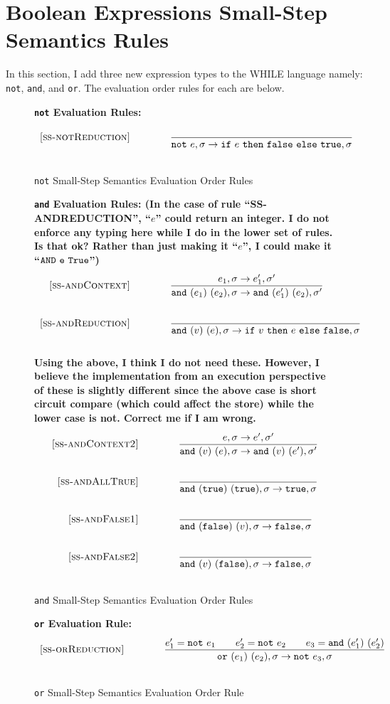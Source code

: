 \documentclass{article}
\newcommand{\ife}[3]{\mbox{\tt if}~{#1}~\mbox{\tt then}~{#2}~\mbox{\tt else}~{#3}}
\newcommand{\note}[1]{\mbox{\tt not}~#1}
\newcommand{\ande}[2]{\mbox{\tt and}~(#1)~(#2)}
\newcommand{\ore}[2]{\mbox{\tt or}~(#1)~(#2)}
\newcommand{\true}{\mbox{\tt true}}
\newcommand{\false}{\mbox{\tt false}}
\begin{document}
\section{Boolean Expressions Small-Step Semantics Rules}


In this section, I add three new expression types to the WHILE language namely: {\tt not}, {\tt and}, and {\tt or}.  The evaluation order rules for each are below.

\begin{figure}[H]\label{fig:notRules}
\caption{{\tt not} Small-Step Semantics Evaluation Order Rules}
{\bf {\tt not} Evaluation Rules:} 
\[
\\
\begin{array}{r@{\qquad\qquad}l}
\ssrule{ss-notReduction}{
}{
  \sstep{\note{e}}{\sigma}{\ife{e}{\false}{\true}}{\sigma}
}
\end{array}
\]
\end{figure}

\begin{figure}[H]\label{fig:andRules}
\caption{{\tt and} Small-Step Semantics Evaluation Order Rules}
{\bf {\tt and} Evaluation Rules: (In the case of rule ``SS-ANDREDUCTION'', ``$e$'' could return an integer.  I do not enforce any typing here while I do in the lower set of rules.  Is that ok?  Rather than just making it ``$e$'', I could make it ``${\tt AND~e~True}$'')}
\[
\\
\begin{array}{r@{\qquad\qquad}l}
\ssrule{ss-andContext}{
  \sstep{e_1}{\sigma}{e_1'}{\sigma'}
}{
  \sstep{\ande{e_1}{e_2}}{\sigma}{\ande{e_1'}{e_2}}{\sigma'}
}
\ssrule{ss-andReduction}{
}{
  \sstep{\ande{v}{e}}{\sigma}{\ife{v}{e}{\false}}{\sigma}
}
\end{array}
\]
{\bf Using the above, I think I do not need these.  However, I believe the implementation
from an execution perspective of these is slightly different since the above case is short circuit compare (which could affect the store) while the lower case is not.  Correct me if I am wrong.} 
\[
\\
\begin{array}{r@{\qquad\qquad}l}
\ssrule{ss-andContext2}{
  \sstep{e}{\sigma}{e'}{\sigma'}
}{
  \sstep{\ande{v}{e}}{\sigma}{\ande{v}{e'}}{\sigma'}
}
\ssrule{ss-andAllTrue}{
}{
  \sstep{\ande{\true}{\true}}{\sigma}{\true}{\sigma}
}
\ssrule{ss-andFalse1}{
}{
  \sstep{\ande{\false}{v}}{\sigma}{\false}{\sigma}
}
\ssrule{ss-andFalse2}{
}{
  \sstep{\ande{v}{\false}}{\sigma}{\false}{\sigma}
}
\end{array}
\]
\end{figure}

\begin{figure}[H]\label{fig:orRules}
\caption{{\tt or} Small-Step Semantics Evaluation Order Rule}
{\bf {\tt or} Evaluation Rule:} 
\[
\\
\begin{array}{r@{\qquad\qquad}l}
\ssrule{ss-orReduction}{
  e_1'=\note{e_1} \qquad e_2'=\note{e_2} \qquad e_3=\ande{e_1'}{e_2'}
}{
  \sstep{\ore{e_1}{e_2}}{\sigma}{\note{e_3}}{\sigma}
}
\end{array}
\]
\end{figure}
\end{document}
